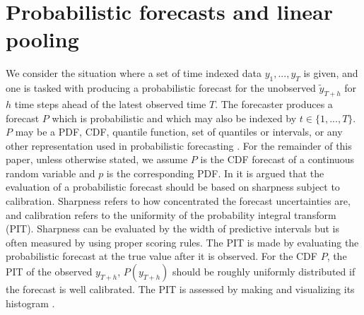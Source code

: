 



\section{Probabilistic forecasts and linear pooling} \label{sec:preliminaries}

We consider the situation where a set of time indexed data $y_1,..., y_T$ 
is given, and one 
is tasked with producing a probabilistic forecast for the unobserved 
$\tilde{y}_{T+h}$ for $h$ time steps ahead of the latest observed time $T$. The 
forecaster produces a forecast $P$ which is probabilistic and which 
may also be indexed by $t \in \{1, ..., T\}$. $P$ may be a PDF, CDF, quantile 
function, set of quantiles or intervals, or any other representation used in 
probabilistic forecasting 
\cite[]{wadsworth2023mixture,gneiting2014probabilistic}. For the 
remainder of this paper, unless otherwise stated, we assume $P$ is the CDF 
forecast of a continuous random variable and $p$ is the corresponding PDF. In
\cite{gneiting2007probabilistic} it is
argued that the evaluation of a probabilistic forecast should be
based on sharpness subject to calibration. Sharpness refers to 
how concentrated the forecast uncertainties are, and calibration refers to 
the uniformity of the probability integral transform (PIT). 
Sharpness can be evaluated by the width of predictive intervals but is often 
measured by using proper scoring rules.
The PIT is made by evaluating the probabilistic forecast at the true value 
after it is observed. For the CDF $P$, the PIT of the observed 
$y_{T+h}$, $P(y_{T+h})$ should be roughly uniformly distributed if the 
forecast is well calibrated. The PIT is assessed by making and visualizing 
its histogram \cite[]{gneiting2007probabilistic,hamill2001interpretation}.

